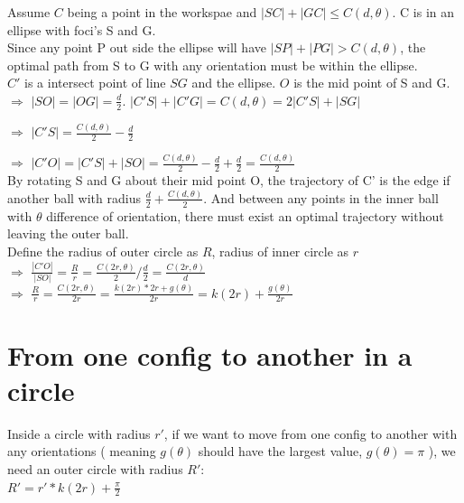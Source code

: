 \documentclass[12pt]{article}
\begin{document}
  Assume $C$ being a point in the workspae and $|SC|+|GC| \leq C( d, \theta )$. C is in an ellipse with foci's S and G. \\ 
  
  Since any point P out side the ellipse will have $|SP| + |PG| > C( d, \theta )$, the optimal path from S to G with any orientation must be within the ellipse.\\
  
  $C'$ is a intersect point of line $SG$ and the ellipse. $O$ is the mid point of S and G. \\
  
  $\Longrightarrow$ $|SO| = |OG| = \frac{d}{2}$. $|C'S| + |C'G| = C( d, \theta ) = 2|C'S| + |SG|$
  
  $\Longrightarrow$ $|C'S| = \frac{C( d, \theta )}{2} - \frac{d}{2}$

  $\Longrightarrow$ $|C'O| = |C'S|+|SO| = \frac{C( d, \theta )}{2} - \frac{d}{2} + \frac{d}{2} = \frac{C( d, \theta )}{2}$\\

  By rotating S and G about their mid point O, the trajectory of C' is the edge if another ball with radius $\frac{d}{2} + \frac{C( d, \theta )}{2}$. And between any points in the inner ball with $\theta$ difference of orientation, there must exist an optimal trajectory without leaving the outer ball. \\

  Define the radius of outer circle as $R$, radius of inner circle as $r$\\

  $\Longrightarrow$ $\frac{|C'O|}{|SO|} = \frac{R}{r} = \frac{C(2r,\theta)}{2} / \frac{d}{2} = \frac{C(2r,\theta)}{d}$\\

  $\Longrightarrow$ $\frac{R}{r} = \frac{C(2r,\theta)}{2r} = \frac{k(2r)*2r + g(\theta)}{2r} = k(2r) + \frac{g(\theta)}{2r}$\\

  \section{From one config to another in a circle}

  Inside a circle with radius $r'$, if we want to move from one config to another with any orientations ( meaning $g(\theta)$ should have the largest value, $g(\theta) = \pi$ ), we need an outer circle with radius $R'$:\\

  $R' = r' * k(2r) + \frac{\pi}{2}$\\
\end{document}
